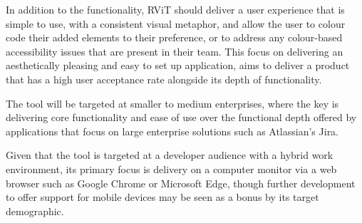 \documentclass[l4proj.tex]{subfiles}
\begin{document}
In addition to the functionality, RViT should deliver a user experience that is simple to use, with a consistent visual metaphor, and allow the user to colour code their added elements to their preference, or to address any colour-based accessibility issues that are present in their team. This focus on delivering an aesthetically pleasing and easy to set up application, aims to deliver a product that has a high user acceptance rate alongside its depth of functionality.

The tool will be targeted at smaller to medium enterprises, where the key is delivering core functionality and ease of use over the functional depth offered by applications that focus on large enterprise solutions such as Atlassian’s Jira.

Given that the tool is targeted at a developer audience with a hybrid work environment, its primary focus is delivery on a computer monitor via a web browser such as Google Chrome or Microsoft Edge, though further development to offer support for mobile devices may be seen as a bonus by its target demographic.
\end{document}
